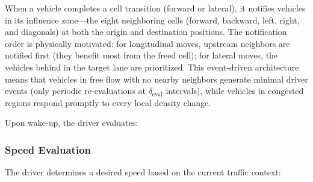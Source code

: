 \documentclass[review,authoryear]{elsarticle}
\begin{document}
When a vehicle completes a cell transition (forward or lateral), it notifies vehicles in its influence zone---the eight neighboring cells (forward, backward, left, right, and diagonals) at both the origin and destination positions. The notification order is physically motivated: for longitudinal moves, upstream neighbors are notified first (they benefit most from the freed cell); for lateral moves, the vehicles behind in the target lane are prioritized. This event-driven architecture means that vehicles in free flow with no nearby neighbors generate minimal driver events (only periodic re-evaluations at $\delta_{\text{eval}}$ intervals), while vehicles in congested regions respond promptly to every local density change.

Upon wake-up, the driver evaluates:

\subsubsection{Speed Evaluation}
\label{sec:speed_eval}

The driver determines a desired speed based on the current traffic context:
\end{document}
